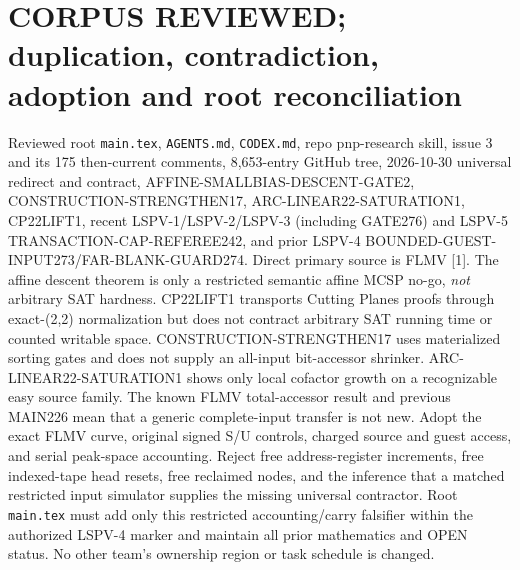 \documentclass[11pt]{article}
\begin{document}
\section*{CORPUS REVIEWED; duplication, contradiction, adoption and root reconciliation}
Reviewed root \texttt{main.tex}, \texttt{AGENTS.md}, \texttt{CODEX.md}, repo pnp-research skill, issue 3 and its 175 then-current comments, 8,653-entry GitHub tree, 2026-10-30 universal redirect and contract, AFFINE-SMALLBIAS-DESCENT-GATE2, CONSTRUCTION-STRENGTHEN17, ARC-LINEAR22-SATURATION1, CP22LIFT1, recent LSPV-1/LSPV-2/LSPV-3 (including GATE276) and LSPV-5 TRANSACTION-CAP-REFEREE242, and prior LSPV-4 BOUNDED-GUEST-INPUT273/FAR-BLANK-GUARD274. Direct primary source is FLMV [1]. The affine descent theorem is only a restricted semantic affine MCSP no-go, \emph{not} arbitrary SAT hardness. CP22LIFT1 transports Cutting Planes proofs through exact-(2,2) normalization but does not contract arbitrary SAT running time or counted writable space. CONSTRUCTION-STRENGTHEN17 uses materialized sorting gates and does not supply an all-input bit-accessor shrinker. ARC-LINEAR22-SATURATION1 shows only local cofactor growth on a recognizable easy source family.
The known FLMV total-accessor result and previous MAIN226 mean that a generic complete-input transfer is not new. Adopt the exact FLMV curve, original signed S/U controls, charged source and guest access, and serial peak-space accounting. Reject free address-register increments, free indexed-tape head resets, free reclaimed nodes, and the inference that a matched restricted input simulator supplies the missing universal contractor. Root \texttt{main.tex} must add only this restricted accounting/carry falsifier within the authorized LSPV-4 marker and maintain all prior mathematics and OPEN status. No other team's ownership region or task schedule is changed.
\end{document}
